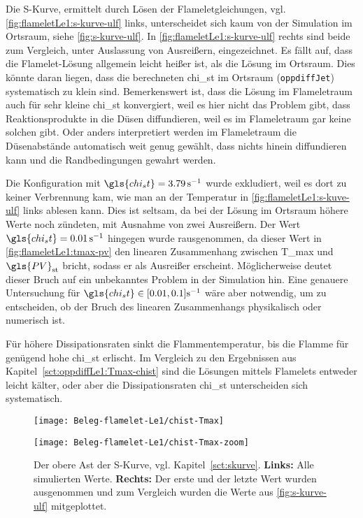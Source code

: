 Die S-Kurve, ermittelt durch Lösen der Flameletgleichungen, vgl. \autoref{fig:flameletLe1:s-kurve-ulf} links, unterscheidet sich kaum von der Simulation im Ortsraum, siehe \autoref{fig:s-kurve-ulf}. In \autoref{fig:flameletLe1:s-kurve-ulf} rechts sind beide zum Vergleich, unter Auslassung von Ausreißern, eingezeichnet. Es fällt auf, dass die Flamelet-Lösung allgemein leicht heißer ist, als die Lösung im Ortsraum. Dies könnte daran liegen, dass die berechneten \gls{chi_st} im Ortsraum (\lstinline!oppdiffJet!) systematisch zu klein sind. Bemerkenswert ist, dass die Lösung im Flameletraum auch für sehr kleine \gls{chi_st} konvergiert, weil es hier nicht das Problem gibt, dass Reaktionsprodukte in die Düsen diffundieren, weil es im Flameletraum gar keine solchen gibt. Oder anders interpretiert werden im Flameletraum die Düsenabstände automatisch weit genug gewählt, dass nichts hinein diffundieren kann und die Randbedingungen gewahrt werden.

Die Konfiguration mit $\gls{chi_st}=\SI{3.79}{\per\second}$ wurde exkludiert, weil es dort zu keiner Verbrennung kam, wie man an der Temperatur in \autoref{fig:flameletLe1:s-kuve-ulf} links ablesen kann. Dies ist seltsam, da bei der Lösung im Ortsraum höhere Werte noch zündeten, mit Ausnahme von zwei Ausreißern.
Der Wert $\gls{chi_st}=\SI{0.01}{\per\second}$ hingegen wurde rausgenommen, da dieser Wert in \autoref{fig:flameletLe1:tmax-pv} den linearen Zusammenhang zwischen \gls{T_max} und $\gls{PV}_\mathrm{st}$ bricht, sodass er als Ausreißer erscheint. Möglicherweise deutet dieser Bruch auf ein unbekanntes Problem in der Simulation hin. Eine genauere Untersuchung für $\gls{chi_st} \in [0.01,0.1]\SI{}{\per\second}$ wäre aber notwendig, um zu entscheiden, ob der Bruch des linearen Zusammenhangs physikalisch oder numerisch ist.

Für höhere Dissipationsraten sinkt die Flammentemperatur, bis die Flamme für genügend hohe \gls{chi_st} erlischt. Im Vergleich zu den Ergebnissen aus Kapitel~\ref{sct:oppdiffLe1:Tmax-chist} sind die Lösungen mittels Flamelets entweder leicht kälter, oder aber die Dissipationsraten \gls{chi_st} unterscheiden sich systematisch.

\begin{figure}[H]
    \begin{center}\begin{minipage}{0.49\linewidth}
        \texttt{[image: Beleg-flamelet-Le1/chist-Tmax]}
    \end{minipage}\begin{minipage}{0.49\linewidth}
        \texttt{[image: Beleg-flamelet-Le1/chist-Tmax-zoom]}
    \end{minipage}\end{center}
    \caption{Der obere Ast der S-Kurve, vgl. Kapitel~\ref{sct:skurve}. \textbf{Links:} Alle simulierten Werte. \textbf{Rechts:} Der erste und der letzte Wert wurden ausgenommen und zum Vergleich wurden die Werte aus \autoref{fig:s-kurve-ulf} mitgeplottet.}
    \label{fig:flameletLe1:s-kurve-ulf}
\end{figure}


